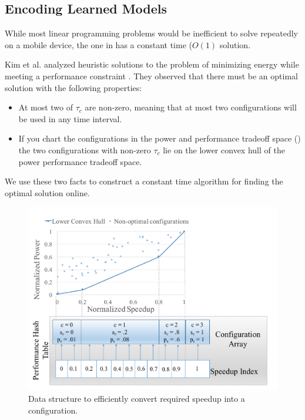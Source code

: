 \subsection{Encoding Learned Models}


  While most linear programming problems would be inefficient to solve
repeatedly on a mobile device, the one in  has a
constant time ($O(1)$ solution.

Kim et al. analyzed heuristic solutions to the problem of minimizing
energy while meeting a performance constraint \cite{kim-cpsna}.  They
observed that there must be an optimal solution with the following
properties:
\begin{itemize}
\item At most two of $\tau_c$ are non-zero, meaning that at most two
  configurations will be used in any time interval.
\item If you chart the configurations in the power and performance
  tradeoff space () the two configurations with
  non-zero $\tau_c$ lie on the lower convex hull of the power
  performance tradeoff space.
\end{itemize}
We use these two facts to construct a constant time algorithm for
finding the optimal solution online.


\begin{figure}
\includegraphics[width=\columnwidth]{figures/performance-hash-table.pdf}
\caption{Data structure to efficiently convert required speedup into a
  configuration.}
  \label{fig:pht}
\end{figure}



